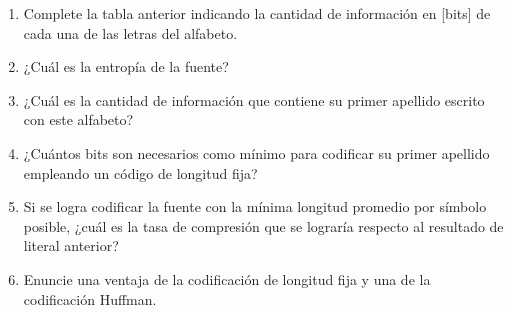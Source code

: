 \begin{enumerate}
\begin{enumerate}
\begin{table}[h]
	\centering
	\captionsetup{justification = raggedright,singlelinecheck = false}
    \caption{Probabilidad de aparición de diferentes letras del alfabeto.}
    \label{tabla:tabla17}
\end{table}
	
	\begin{enumerate}
		\item Complete la tabla anterior indicando la cantidad de información en [bits] de cada una de las letras del alfabeto. 
		
		\item ¿Cuál es la entropía de la fuente? 
		
		\item ¿Cuál es la cantidad de información que contiene su primer apellido escrito con este alfabeto? 
		
		\item ¿Cuántos bits son necesarios como mínimo para codificar su primer apellido empleando un código de longitud fija?
		
		
		\item Si se logra codificar la fuente con la mínima longitud promedio por símbolo posible, ¿cuál es la tasa de compresión que se lograría respecto al resultado de literal anterior?
		
		\item Enuncie una ventaja de la codificación de longitud fija y una de la codificación Huffman.
		

\end{enumerate}
\end{enumerate}
\end{enumerate}
